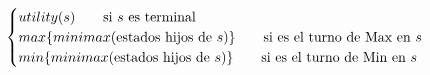 \documentclass[preview]{standalone}
\begin{document}
\begin{align*}
\begin{cases}
                                 utility(s) \qquad \text{si $s$ es terminal} \cr
                                 max\{minimax(\text{estados hijos de $s$})\}\qquad \text{si es el turno de Max en $s$} \cr
                                 min\{minimax(\text{estados hijos de $s$})\}\qquad \text{si es el turno de Min en $s$} \cr
                                 \end{cases}
\end{align*}
\end{document}
